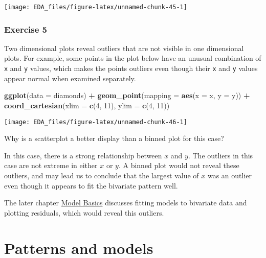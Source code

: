 \documentclass[]{book}
\newenvironment{Shaded}{\begin{snugshade}}{\end{snugshade}}
\newcommand{\DataTypeTok}[1]{\textcolor[rgb]{0.13,0.29,0.53}{#1}}
\newcommand{\DecValTok}[1]{\textcolor[rgb]{0.00,0.00,0.81}{#1}}
\newcommand{\KeywordTok}[1]{\textcolor[rgb]{0.13,0.29,0.53}{\textbf{#1}}}
\newcommand{\NormalTok}[1]{#1}
\newcommand{\OperatorTok}[1]{\textcolor[rgb]{0.81,0.36,0.00}{\textbf{#1}}}
\newcommand{\StringTok}[1]{\textcolor[rgb]{0.31,0.60,0.02}{#1}}
\theoremstyle{plain}
\theoremstyle{remark}
\theoremstyle{definition}
\theoremstyle{definition}
\theoremstyle{definition}
\theoremstyle{remark}
\begin{document}
\begin{center}\texttt{[image: EDA\_files/figure-latex/unnamed-chunk-45-1]} \end{center}

\hypertarget{exercise-5-7}{%
\subsubsection{Exercise 5}\label{exercise-5-7}}

Two dimensional plots reveal outliers that are not visible in one
dimensional plots. For example, some points in the plot below have an
unusual combination of \texttt{x} and \texttt{y} values, which makes the
points outliers even though their \texttt{x} and \texttt{y} values
appear normal when examined separately.

\begin{Shaded}
\begin{Highlighting}[]
\KeywordTok{ggplot}\NormalTok{(}\DataTypeTok{data =}\NormalTok{ diamonds) }\OperatorTok{+}
\StringTok{  }\KeywordTok{geom_point}\NormalTok{(}\DataTypeTok{mapping =} \KeywordTok{aes}\NormalTok{(}\DataTypeTok{x =}\NormalTok{ x, }\DataTypeTok{y =}\NormalTok{ y)) }\OperatorTok{+}
\StringTok{  }\KeywordTok{coord_cartesian}\NormalTok{(}\DataTypeTok{xlim =} \KeywordTok{c}\NormalTok{(}\DecValTok{4}\NormalTok{, }\DecValTok{11}\NormalTok{), }\DataTypeTok{ylim =} \KeywordTok{c}\NormalTok{(}\DecValTok{4}\NormalTok{, }\DecValTok{11}\NormalTok{))}
\end{Highlighting}
\end{Shaded}

\begin{center}\texttt{[image: EDA\_files/figure-latex/unnamed-chunk-46-1]} \end{center}

Why is a scatterplot a better display than a binned plot for this case?

In this case, there is a strong relationship between \(x\) and \(y\).
The outliers in this case are not extreme in either \(x\) or \(y\). A
binned plot would not reveal these outliers, and may lead us to conclude
that the largest value of \(x\) was an outlier even though it appears to
fit the bivariate pattern well.

The later chapter \protect\hyperlink{model-basics}{Model Basics}
discusses fitting models to bivariate data and plotting residuals, which
would reveal this outliers.

\hypertarget{patterns-and-models}{%
\section{Patterns and models}\label{patterns-and-models}}
\end{document}
